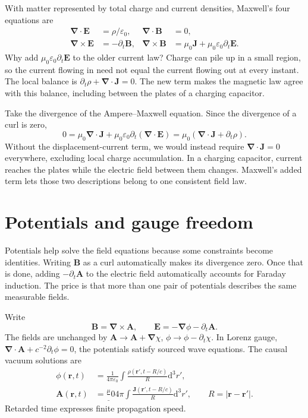 \documentclass[11pt,oneside]{book}
\newcommand{\dd}{\mathrm{d}}
\newcommand{\vect}[1]{\boldsymbol{#1}}
\newcommand{\grad}{\boldsymbol{\nabla}}
\newcommand{\eps}{\varepsilon_0}
\newcommand{\mun}{\mu_0}
\theoremstyle{reviewstyle}
\begin{document}
With matter represented by total charge and current densities, Maxwell's four equations are
\begin{align}
\grad\cdot\vect E&=\rho/\eps,&\grad\cdot\vect B&=0,\\
\grad\times\vect E&=-\partial_t\vect B,&
\grad\times\vect B&=\mun\vect J+\mun\eps\partial_t\vect E.
\end{align}
Why add $\mun\eps\partial_t\vect E$ to the older current law? Charge can pile up in a small region, so the current flowing in need not equal the current flowing out at every instant. The local balance is $\partial_t\rho+\grad\cdot\vect J=0$. The new term makes the magnetic law agree with this balance, including between the plates of a charging capacitor.

Take the divergence of the Ampere--Maxwell equation. Since the divergence of a curl is zero,
\begin{equation}
0=\mun\grad\cdot\vect J+\mun\eps\partial_t(\grad\cdot\vect E)
=\mun(\grad\cdot\vect J+\partial_t\rho).
\end{equation}
Without the displacement-current term, we would instead require $\grad\cdot\vect J=0$ everywhere, excluding local charge accumulation. In a charging capacitor, current reaches the plates while the electric field between them changes. Maxwell's added term lets those two descriptions belong to one consistent field law.

\section{Potentials and gauge freedom}
Potentials help solve the field equations because some constraints become identities. Writing $\vect B$ as a curl automatically makes its divergence zero. Once that is done, adding $-\partial_t\vect A$ to the electric field automatically accounts for Faraday induction. The price is that more than one pair of potentials describes the same measurable fields.

Write
\begin{equation}\vect B=\grad\times\vect A,\qquad \vect E=-\grad\phi-\partial_t\vect A.\end{equation}
The fields are unchanged by $\vect A\to\vect A+\grad\chi$, $\phi\to\phi-\partial_t\chi$. In Lorenz gauge, $\grad\cdot\vect A+c^{-2}\partial_t\phi=0$, the potentials satisfy sourced wave equations. The causal vacuum solutions are
\begin{align}
\phi(\vect r,t)&=\frac1{4\pi\eps}\int\frac{\rho(\vect r',t-R/c)}R\dd^3r',\\
\vect A(\vect r,t)&=\frac\mun{4\pi}\int\frac{\vect J(\vect r',t-R/c)}R\dd^3r',\qquad R=|\vect r-\vect r'|.
\end{align}
Retarded time expresses finite propagation speed.
\end{document}
